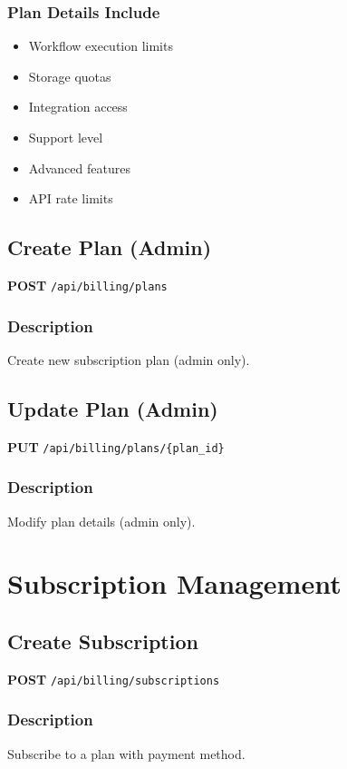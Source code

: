 \documentclass[11pt,a4paper]{report}
\begin{document}
\subsubsection{Plan Details Include}
\begin{itemize}[leftmargin=*]
    \item Workflow execution limits
    \item Storage quotas
    \item Integration access
    \item Support level
    \item Advanced features
    \item API rate limits
\end{itemize}

\subsection{Create Plan (Admin)}

\textbf{POST} \texttt{/api/billing/plans}

\subsubsection{Description}
Create new subscription plan (admin only).

\subsection{Update Plan (Admin)}

\textbf{PUT} \texttt{/api/billing/plans/\{plan\_id\}}

\subsubsection{Description}
Modify plan details (admin only).

\section{Subscription Management}

\subsection{Create Subscription}

\textbf{POST} \texttt{/api/billing/subscriptions}

\subsubsection{Description}
Subscribe to a plan with payment method.
\end{document}
